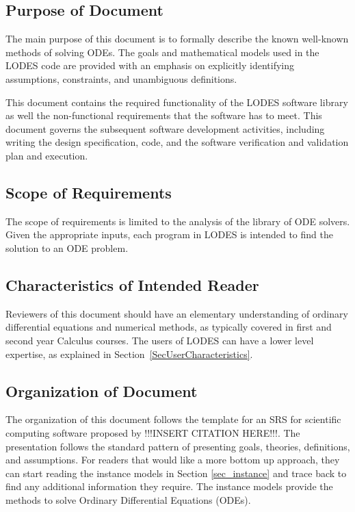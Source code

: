 \documentclass[12pt]{article}
\newcommand{\progname}{LODES} %
\begin{document}
\subsection{Purpose of Document}

The main purpose of this document is to formally describe the known well-known methods of
solving ODEs. The goals and mathematical models used in the \progname{} code are provided with
an emphasis on explicitly identifying assumptions, constraints, and unambiguous definitions.

This document contains the required functionality of the \progname{} software library as well
the non-functional requirements that the software has to meet. This document governs the
subsequent software development activities, including writing the design specification, code,
and the software verification and validation plan and execution.

\subsection{Scope of Requirements} 

The scope of requirements is limited to the analysis of the library of ODE solvers. Given
the appropriate inputs, each program in \progname{} is intended to find the solution to an
ODE problem.

\subsection{Characteristics of Intended Reader}

Reviewers of this document should have an elementary understanding of ordinary differential
equations and numerical methods, as typically covered in first and second year Calculus courses.
The users of \progname{} can have a lower level expertise, as explained in
Section~\ref{SecUserCharacteristics}.

\subsection{Organization of Document}

The organization of this document follows the template for an SRS for scientific
computing software proposed by !!!INSERT CITATION HERE!!!. The presentation follows the standard
pattern of presenting goals, theories, definitions, and assumptions. For readers that would
like a more bottom up approach, they can start reading the instance models in Section
\ref{sec_instance} and trace back to find any additional information they require.  The
instance models provide the methods to solve Ordinary Differential Equations (ODEs).
\end{document}

